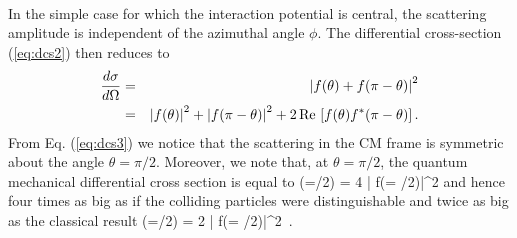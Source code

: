 \paragraph{}
In the simple case for which the interaction potential is central, the scattering 
amplitude is independent of the azimuthal angle $\phi$. The differential cross-section (\ref{eq:dcs2}) 
then reduces to 
\begin{eqnarray}
\frac{d\sigma}{d\Omega} & =& \left| f(\theta)+f(\pi-\theta)\right|^2 \nonumber \\
& = & \left| f(\theta)\right|^2 + \left| f(\pi-\theta)\right|^2 + 2\, {\rm Re}\,\left[f(\theta)f^*(\pi-\theta)\right].
\label{eq:dcs3}
\end{eqnarray}
From Eq. (\ref{eq:dcs3}) we notice that the scattering in the CM frame is symmetric about the angle $\theta=\pi/2$.
Moreover, we note that, at $\theta=\pi/2$, the quantum mechanical differential cross section is equal to
\be
{}(\theta=\pi/2) = 4 \left| f(\theta = \pi/2)\right|^2
\label{eq:identicalbosons}
\ee
and hence four times as big as if the colliding particles were distinguishable and twice as big as the classical result
\be
{}(\theta=\pi/2) = 2 \left| f(\theta = \pi/2)\right|^2\, .
\ee

